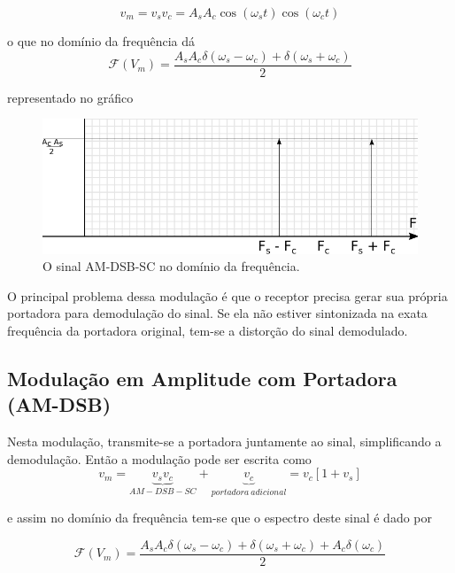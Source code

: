 \documentclass[]{report}
\begin{document}
\begin{equation}\label{eq_am_dsb_sc_tempo}
v_m = v_s v_c = A_s A_c \cos(\omega_s t) \cos(\omega_c t)
\end{equation}

o que no domínio da frequência dá
\begin{equation}
\mathcal{F}(V_m)= \frac{A_s A_c \delta(\omega_s - \omega_c) + \delta(\omega_s + \omega_c)}{2}
\end{equation}

representado no gráfico
\begin{figure}[H]
\begin{center}
\includegraphics[scale=0.8,clip]{./imagens/frequencia_AM_DSB_SC}
\end{center}
\caption{O sinal AM-DSB-SC no domínio da frequência.}
\label{fig:am_dsb_sc_frequencia}
\end{figure}

O principal problema dessa modulação é que o receptor precisa gerar sua própria portadora para demodulação do sinal. Se ela não estiver sintonizada na exata frequência da portadora original, tem-se a distorção do sinal demodulado. 

\subsection{Modulação em Amplitude com Portadora (AM-DSB)}
Nesta modulação, transmite-se a portadora juntamente ao sinal, simplificando a demodulação. Então a modulação pode ser escrita como
\begin{equation}\label{eq_am_dsb_tempo}
v_m = \underbrace{v_s v_c}_{AM-DSB-SC} + \underbrace{v_c}_{portadora\ adicional} = v_c [1 + v_s]
\end{equation}

e assim no domínio da frequência tem-se que o espectro deste sinal é dado por

\begin{equation}
\mathcal{F}(V_m)= \frac{A_s A_c \delta(\omega_s - \omega_c) + \delta(\omega_s + \omega_c) + A_c \delta(\omega_c)}{2}
\end{equation}
\end{document}
